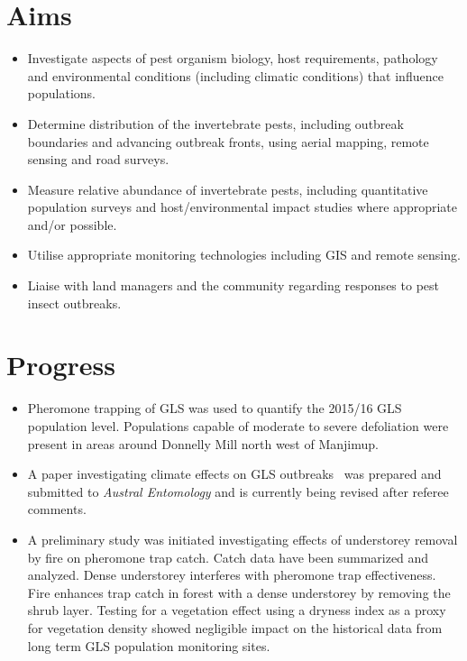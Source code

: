 \documentclass[version=last,
    paper=a4, %
    10pt, %
    usenames,
    dvipsnames,
    oneside, %
    headings=openany, %
    DIV=15 %
]{scrbook}
\begin{document}
\section*{Aims}
\begin{itemize}
\itemsep1pt\parskip0pt
\item
  Investigate aspects of pest organism biology, host requirements,
  pathology and environmental conditions (including climatic conditions)
  that influence populations.
\item
  Determine distribution of the invertebrate pests, including outbreak
  boundaries and advancing outbreak fronts, using aerial mapping, remote
  sensing and road surveys.
\item
  Measure relative abundance of invertebrate pests, including
  quantitative population surveys and host/environmental impact studies
  where appropriate and/or possible.
\item
  Utilise appropriate monitoring technologies including GIS and remote
  sensing.
\item
  Liaise with land managers and the community regarding responses to
  pest insect outbreaks.
\end{itemize}



\section*{Progress}
\begin{itemize}
\itemsep1pt\parskip0pt
\item
  Pheromone trapping of GLS was used to quantify the 2015/16 GLS
  population level. Populations capable of moderate to severe
  defoliation were present in areas around Donnelly Mill north west of
  Manjimup.
\item
  A paper investigating climate effects on GLS outbreaks~ was prepared
  and submitted to \emph{Austral Entomology} and is currently being
  revised after referee comments.
\item
  A preliminary study was initiated investigating effects of understorey
  removal by fire on pheromone trap catch. Catch data have been
  summarized and analyzed. Dense understorey interferes with pheromone
  trap effectiveness. Fire enhances trap catch in forest with a dense
  understorey by removing the shrub layer. Testing for a vegetation
  effect using a dryness index as a proxy for vegetation density showed
  negligible impact on the historical data from long term GLS population
  monitoring sites.
\end{itemize}
\end{document}

